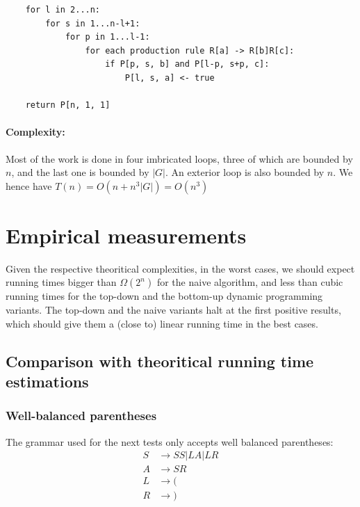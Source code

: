 \documentclass[12pt]{extarticle}
\begin{document}
\begin{multicols}{2}
\begin{lstlisting}
    for l in 2...n:
        for s in 1...n-l+1:
            for p in 1...l-1:
                for each production rule R[a] -> R[b]R[c]:
                    if P[p, s, b] and P[l-p, s+p, c]: 
                        P[l, s, a] <- true

    return P[n, 1, 1]
\end{lstlisting}

\paragraph{Complexity:}
Most of the work is done in four imbricated loops, three of which are bounded by $n$, and the last one
is bounded by $|G|$. An exterior loop is also bounded by $n$.
We hence have $T(n)=O(n + n^3|G|)=O(n^3)$

\newpage
\section{Empirical measurements}
Given the respective theoritical complexities, in the worst cases, we should expect 
running times bigger than $\Omega(2^n)$ for the naive algorithm, and less than cubic
running times for the top-down and the bottom-up dynamic programming variants. The
top-down and the naive variants halt at the first positive results, which should
give them a (close to) linear running time in the best cases.

\subsection{Comparison with theoritical running time estimations}
\subsubsection{Well-balanced parentheses}
The grammar used for the next tests only accepts well balanced parentheses:
\begin{align*}
  S&\rightarrow SS | LA | LR\\
  A&\rightarrow SR\\
  L&\rightarrow (\\
  R&\rightarrow )
\end{align*}

\end{multicols}
\end{document}
